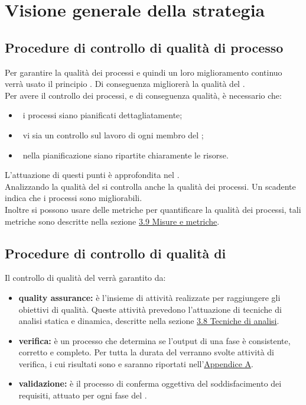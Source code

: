 
\section{Visione generale della strategia}
	\subsection{Procedure di controllo di qualità di processo}
		Per garantire la qualità dei processi e quindi un loro miglioramento continuo verrà usato il principio . Di conseguenza migliorerà la qualità del . \\
		Per avere il controllo dei processi, e di conseguenza qualità, è necessario che:
		\begin{itemize}
			\item\ i processi siano pianificati dettagliatamente;
			\item\ vi sia un controllo sul lavoro di ogni membro del ;
			\item\ nella pianificazione siano ripartite chiaramente le risorse.
		\end{itemize}
		L'attuazione di questi punti è approfondita nel \PPdoc. \\
		Analizzando la qualità del  si controlla anche la qualità dei processi. Un  scadente indica che i processi sono migliorabili. \\
		Inoltre si possono usare delle metriche per quantificare la qualità dei processi, tali metriche sono descritte nella sezione \hyperref[sec:3.9]{3.9 Misure e metriche}.
	\subsection{Procedure di controllo di qualità di }
		Il controllo di qualità del  verrà garantito da:
		\begin{itemize}
			\item \textbf{quality assurance:} è l'insieme di attività realizzate per raggiungere gli obiettivi di qualità. Queste attività prevedono l'attuazione di tecniche di analisi statica e dinamica, descritte nella sezione \hyperref[sec:3.8]{3.8 Tecniche di analisi}.
			\item \textbf{verifica:} è un processo che determina se l'output di una fase è consistente, corretto e completo. Per tutta la durata del  verranno svolte attività di verifica, i cui risultati sono e saranno riportati nell'\hyperref[sec:A]{Appendice A}.
			\item \textbf{validazione:} è il processo di conferma oggettiva del soddisfacimento dei requisiti, attuato per ogni fase del .
		\end{itemize}
